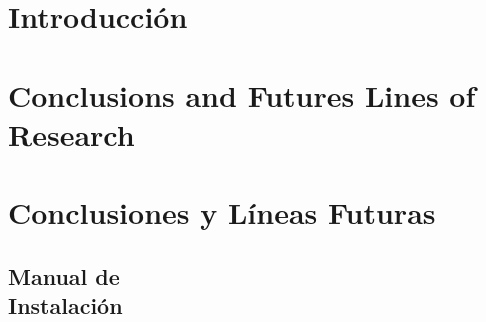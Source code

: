\documentclass[12pt, a4paper, twoside]{article}
\begin{document}


\clearpage
\setcounter{page}{1}



\newpage



\newpage



\tableofcontents

\section{Introducción}


\section{Conclusions and Futures Lines of Research}


\section{Conclusiones y Líneas Futuras}


\printbibliography

\newpage

\begin{umaappendices}
  \section{Manual de \\ Instalación}

\end{umaappendices}


\end{document}
